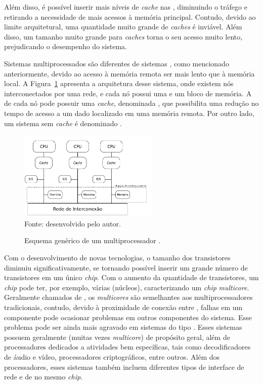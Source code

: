 Além disso, é possível inserir mais níveis de \textit{cache} nas \cpus,
diminuindo o tráfego e retirando a necessidade de mais acessos à memória
principal. Contudo, devido ao limite arquitetural, uma quantidade muito grande
de \textit{caches} é inviável. Além disso, um tamanho muito grande para
\textit{caches} torna o seu acesso muito lento, prejudicando o desempenho do
sistema.

Sistemas multiprocessados \numa são diferentes de sistemas \uma, como mencionado
anteriormente, devido ao acesso à memória remota ser mais lento que à memória
local. A Figura~\ref{fig:numa} apresenta a arquitetura desse sistema, onde
existem nós interconectados por uma rede, e cada nó possui uma \cpu e um bloco
de memória. A \cpu de cada nó pode possuir uma \textit{cache}, denominada
\ccnuma, que possibilita uma redução no tempo de acesso a um dado localizado em
uma memória remota. Por outro lado, um sistema sem \textit{cache} é
denominado \ncnuma.

\begin{figure}[t]
	\centering
    \caption{Esquema genérico de um multiprocessador \numa.}
    \includegraphics[width=0.6\textwidth]{figs/multiprocNUMA.pdf} \\
    Fonte: desenvolvido pelo autor.
    \label{fig:numa}
\end{figure}

Com o desenvolvimento de novas tecnologias, o tamanho
dos transistores diminuiu significativamente, se tornando possível inserir um
grande número de transistores em um único \textit{chip}.
Com o aumento da quantidade de transistores, um \textit{chip} pode ter, por
exemplo, várias \cpus (núcleos), caracterizando um
\textit{chip} \textit{multicore}.
Geralmente chamados de \cmps, os \textit{multicores} são semelhantes aos multiprocessadores
tradicionais, contudo, devido à proximidade de conexão entre \cpus, falhas em um
componente pode ocasionar problemas em outros componentes do sistema.
Esse problema pode ser ainda mais agravado em sistemas do tipo \mpsoc. Esses sistemas
possuem geralmente \cpus (muitas vezes \textit{multicore}) de propósito geral, além de processadores
dedicados a atividades bem específicas, tais como decodificadores de áudio e vídeo, processadores
criptográficos, entre outros. Além dos processadores, esses sistemas também incluem diferentes tipos
de interface de rede e de \es no mesmo \textit{chip}.

